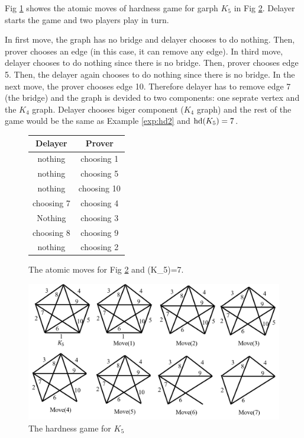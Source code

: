 \documentclass[12pt]{book}
\begin{document}
\begin{examp}\label{exp:hd3}
       Fig \ref{fig:game3} showes the atomic moves of hardness game for garph $K_5$ in Fig \ref{fig:hd3}. Delayer starts the game and two 
	   players play in turn. 
	   
	   In first move, the graph has no bridge and delayer chooses to do nothing. Then, prover chooses an edge (in this case, it can remove 
	   any edge). In third move, delayer chooses to do nothing since there is no bridge. Then, prover chooses edge 5. Then, the delayer 
	   again chooses to do nothing since there is no bridge. In the next move, the prover chooses edge 10. Therefore delayer has to remove 
	   edge 7 (the bridge) and the graph is devided to two components: one seprate vertex and the $K_4$ graph. Delayer chooses biger component 
	   ($K_4$ graph) and the rest of the game would be the same as Example \ref{exp:hd2} and $\operatorname{hd}(K_5)=7$.
	 
	   \begin{figure}[h]
      \centering
      \begin{tabular}{|c|c|} 
      \hline
                  Delayer & Prover \\ \hline
                  nothing & choosing 1  \\ \hline
				  nothing & choosing 5  \\ \hline
				  nothing & choosing 10  \\ \hline
                  choosing 7 & choosing 4  \\ \hline
				  Nothing & choosing 3  \\ \hline
                  choosing 8 & choosing 9  \\ \hline
				  nothing & choosing 2  \\ \hline
      \end{tabular}
      \caption{The atomic moves for Fig \ref{fig:hd3} and \hardness(K_5)=7.}
      \label{fig:game3}
      \end{figure}
	  \begin{figure}
      \begin{center}
      \includegraphics[scale =0.6]{g3.png}
      \caption{The hardness game for $K_5$}
	  \label{fig:hd3}
      \end{center}
      \end{figure}
\end{examp}
\end{document}
